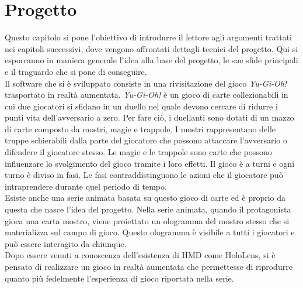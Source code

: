 \chapter{Progetto}\label{chap:progetto}
Questo capitolo si pone l'obiettivo di introdurre il lettore agli argomenti trattati nei capitoli successivi, dove vengono affrontati dettagli tecnici del progetto. Qui si esporranno
in maniera generale l'idea alla base del progetto, le sue sfide principali e il traguardo che si pone di conseguire.\\
\newline
Il software che si è sviluppato consiste in una rivisitazione del gioco \textit{Yu-Gi-Oh!} trasportato in realtà aumentata. \textit{Yu-Gi-Oh!} è un gioco di 
carte collezionabili in cui due giocatori si sfidano in un duello nel quale devono cercare di ridurre i punti vita dell'avversario a zero. Per fare ciò, i duellanti sono dotati di un
mazzo di carte composto da mostri, magie e trappole. I mostri rappresentano delle truppe schierabili dalla parte del giocatore che possono attaccare l'avversario o difendere il
giocatore stesso. Le magie e le trappole sono carte che possono influenzare lo svolgimento del gioco tramite i loro effetti. Il gioco è a turni e ogni turno è diviso in fasi. Le 
fasi contraddistinguono le azioni che il giocatore può intraprendere durante quel periodo di tempo.\\
\newline
Esiste anche una serie animata basata su questo gioco di carte ed è proprio da questa che nasce l'idea del progetto. Nella serie animata, quando il protagonista gioca una carta mostro, 
viene proiettato un ologramma del mostro stesso che si materializza sul campo di gioco. Questo ologramma è visibile a tutti i giocatori e può essere interagito da chiunque.\\
Dopo essere venuti a conoscenza dell'esistenza di HMD come HoloLens, si è pensato di realizzare un gioco in realtà aumentata che permettesse di riprodurre quanto più fedelmente
l'esperienza di gioco riportata nella serie.\\



